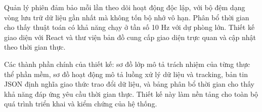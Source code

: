 Quản lý phiên đảm bảo mỗi lần theo dõi hoạt động độc lập, với bộ đệm dạng vòng lưu trữ dữ liệu gần nhất mà không tốn bộ nhớ vô hạn. Phân bổ thời gian cho thấy thuật toán có khả năng chạy ở tần số 10 Hz với dự phòng lớn. Thiết kế giao diện với React và thư viện bản đồ cung cấp giao diện trực quan và cập nhật theo thời gian thực.

Các thành phần chính của thiết kế: sơ đồ lớp mô tả trách nhiệm của từng thực thể phần mềm, sơ đồ hoạt động mô tả luồng xử lý dữ liệu và tracking, bản tin JSON định nghĩa giao thức trao đổi dữ liệu, và bảng phân bổ thời gian cho thấy khả năng đáp ứng yêu cầu thời gian thực. Thiết kế này làm nền tảng cho toàn bộ quá trình triển khai và kiểm chứng của hệ thống.

